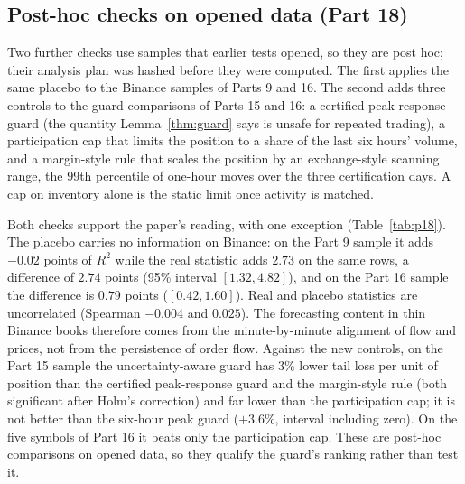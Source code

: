 \subsection{Post-hoc checks on opened data (Part 18)}\label{sec:p18}
Two further checks use samples that earlier tests opened, so they are post hoc; their analysis plan was hashed before they were computed. The first applies the same placebo to the Binance samples of Parts 9 and 16. The second adds three controls to the guard comparisons of Parts 15 and 16: a certified peak-response guard (the quantity Lemma~\ref{thm:guard} says is unsafe for repeated trading), a participation cap that limits the position to a share of the last six hours' volume, and a margin-style rule that scales the position by an exchange-style scanning range, the 99th percentile of one-hour moves over the three certification days. A cap on inventory alone is the static limit once activity is matched.

Both checks support the paper's reading, with one exception (Table~\ref{tab:p18}). The placebo carries no information on Binance: on the Part 9 sample it adds $-0.02$ points of $R^2$ while the real statistic adds $2.73$ on the same rows, a difference of $2.74$ points (95\% interval $[1.32,4.82]$), and on the Part 16 sample the difference is $0.79$ points ($[0.42,1.60]$). Real and placebo statistics are uncorrelated (Spearman $-0.004$ and $0.025$). The forecasting content in thin Binance books therefore comes from the minute-by-minute alignment of flow and prices, not from the persistence of order flow. Against the new controls, on the Part 15 sample the uncertainty-aware guard has 3\% lower tail loss per unit of position than the certified peak-response guard and the margin-style rule (both significant after Holm's correction) and far lower than the participation cap; it is not better than the six-hour peak guard ($+3.6\%$, interval including zero). On the five symbols of Part 16 it beats only the participation cap. These are post-hoc comparisons on opened data, so they qualify the guard's ranking rather than test it.

